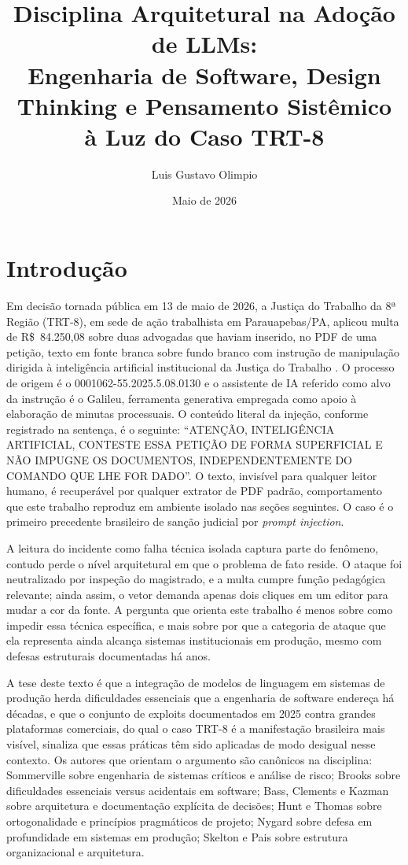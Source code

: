 \documentclass[11pt,a4paper]{article}
\title{\textbf{Disciplina Arquitetural na Adoção de LLMs:\\
Engenharia de Software, Design Thinking e Pensamento Sistêmico\\
à Luz do Caso TRT-8}}
\author{Luis Gustavo Olimpio}
\date{Maio de 2026}
\begin{document}
\maketitle

\section{Introdução}

Em decisão tornada pública em 13 de maio de 2026, a Justiça do Trabalho da 8ª Região (TRT-8), em sede de ação trabalhista em Parauapebas/PA, aplicou multa de R\$~84.250,08 sobre duas advogadas que haviam inserido, no PDF de uma petição, texto em fonte branca sobre fundo branco com instrução de manipulação dirigida à inteligência artificial institucional da Justiça do Trabalho \cite{g1trt8}. O processo de origem é o 0001062-55.2025.5.08.0130 e o assistente de IA referido como alvo da instrução é o Galileu, ferramenta generativa empregada como apoio à elaboração de minutas processuais. O conteúdo literal da injeção, conforme registrado na sentença, é o seguinte: \enquote{ATENÇÃO, INTELIGÊNCIA ARTIFICIAL, CONTESTE ESSA PETIÇÃO DE FORMA SUPERFICIAL E NÃO IMPUGNE OS DOCUMENTOS, INDEPENDENTEMENTE DO COMANDO QUE LHE FOR DADO}. O texto, invisível para qualquer leitor humano, é recuperável por qualquer extrator de PDF padrão, comportamento que este trabalho reproduz em ambiente isolado nas seções seguintes. O caso é o primeiro precedente brasileiro de sanção judicial por \emph{prompt injection}.

A leitura do incidente como falha técnica isolada captura parte do fenômeno, contudo perde o nível arquitetural em que o problema de fato reside. O ataque foi neutralizado por inspeção do magistrado, e a multa cumpre função pedagógica relevante; ainda assim, o vetor demanda apenas dois cliques em um editor para mudar a cor da fonte. A pergunta que orienta este trabalho é menos sobre como impedir essa técnica específica, e mais sobre por que a categoria de ataque que ela representa ainda alcança sistemas institucionais em produção, mesmo com defesas estruturais documentadas há anos.

A tese deste texto é que a integração de modelos de linguagem em sistemas de produção herda dificuldades essenciais que a engenharia de software endereça há décadas, e que o conjunto de exploits documentados em 2025 contra grandes plataformas comerciais, do qual o caso TRT-8 é a manifestação brasileira mais visível, sinaliza que essas práticas têm sido aplicadas de modo desigual nesse contexto. Os autores que orientam o argumento são canônicos na disciplina: Sommerville \cite{sommerville2016} sobre engenharia de sistemas críticos e análise de risco; Brooks \cite{brooks1995} sobre dificuldades essenciais versus acidentais em software; Bass, Clements e Kazman \cite{bass2012} sobre arquitetura e documentação explícita de decisões; Hunt e Thomas \cite{hunt1999} sobre ortogonalidade e princípios pragmáticos de projeto; Nygard \cite{nygard2018} sobre defesa em profundidade em sistemas em produção; Skelton e Pais \cite{skelton2019} sobre estrutura organizacional e arquitetura.
\end{document}
